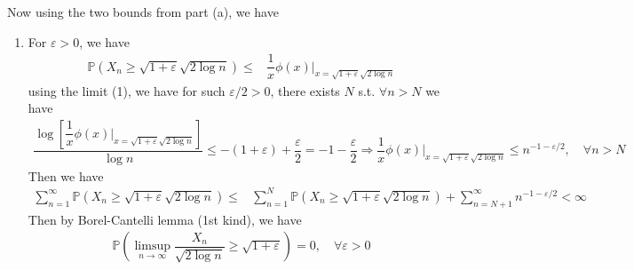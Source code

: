 \documentclass[11pt,a4paper]{article}
\numberwithin{equation}{section}%
\begin{document}
Now using the two bounds from part (a), we have
\begin{enumerate}[topsep=2pt,itemsep=2pt]
    \item For $ \varepsilon >0 $, we have
    \begin{align*}
        \mathbb{P}\left( X_n\geq \sqrt{1+\varepsilon }\sqrt{2\log n} \right) \leq &  \dfrac{ 1 }{ x }\phi(x) \Big|_{x=\sqrt{1+\varepsilon }\sqrt{2\log n}} 
    \end{align*}
    using the limit (1), we have for such $ \varepsilon /2 >0 $, there exists $ N $ s.t. $ \forall n>N $ we have
    \begin{align*}
        \dfrac{ \log \left[ \dfrac{ 1 }{ x }\phi(x) \Big|_{x=\sqrt{1+\varepsilon }\sqrt{2\log n}} \right] }{ \log n } \leq -(1+\varepsilon )+\dfrac{ \varepsilon  }{ 2 } = -1-\dfrac{ \varepsilon  }{ 2 } \Rightarrow \dfrac{ 1 }{ x }\phi(x) \Big|_{x=\sqrt{1+\varepsilon }\sqrt{2\log n}} \leq n^{-1-\varepsilon /2} ,\quad \forall n>N
    \end{align*}
    Then we have
    \begin{align*}
        \sum_{n=1}^\infty  \mathbb{P}\left( X_n\geq \sqrt{1+\varepsilon }\sqrt{2\log n} \right) \leq & \sum_{n=1}^N  \mathbb{P}\left( X_n\geq \sqrt{1+\varepsilon }\sqrt{2\log n} \right) + \sum_{n=N+1}^\infty n^{-1-\varepsilon /2} < \infty
    \end{align*}
    Then by Borel-Cantelli lemma (1st kind), we have
    \begin{align*}
        \mathbb{P}\left( \limsup _{n\to\infty }\dfrac{ X_n }{ \sqrt{2\log n}  }\geq \sqrt{1+\varepsilon }   \right) = 0 ,\quad \forall \varepsilon >0
    \end{align*}
    


\end{enumerate}
\end{document}
